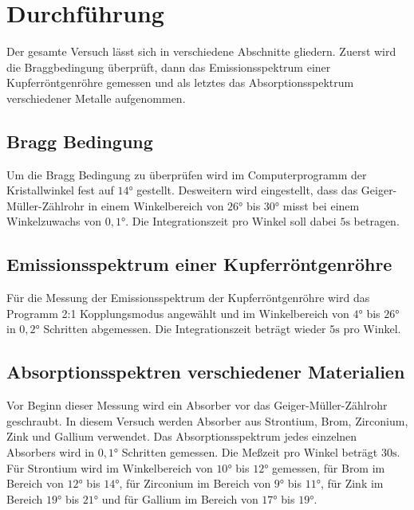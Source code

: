 \section{Durchführung}
\label{sec:Durchführung}
Der gesamte Versuch lässt sich in verschiedene Abschnitte gliedern. Zuerst wird die Braggbedingung überprüft, dann das Emissionsspektrum einer Kupferröntgenröhre 
gemessen und als letztes das Absorptionsspektrum verschiedener Metalle aufgenommen. 
\subsection{Bragg Bedingung}
Um die Bragg Bedingung zu überprüfen wird im Computerprogramm der Kristallwinkel fest auf $14 \unit{\degree}$ gestellt. Desweitern wird eingestellt, 
dass das Geiger-Müller-Zählrohr in einem Winkelbereich von $26 \unit{\degree}$ bis $30 \unit{\degree}$ misst bei einem Winkelzuwachs von $0,1 \unit{\degree}$. Die 
Integrationszeit pro Winkel soll dabei $5 \unit{\second}$ betragen. 

\subsection{Emissionsspektrum einer Kupferröntgenröhre}
Für die Messung der Emissionsspektrum der Kupferröntgenröhre wird das Programm 2:1 Kopplungsmodus angewählt und im Winkelbereich von $4 \unit{\degree}$ bis $26 \unit{\degree}$
in $0,2 \unit{\degree}$ Schritten abgemessen. Die Integrationszeit beträgt wieder $5 \unit{\second}$ pro Winkel. 

\subsection{Absorptionsspektren verschiedener Materialien}
Vor Beginn dieser Messung wird ein Absorber vor das Geiger-Müller-Zählrohr geschraubt. In diesem Versuch werden Absorber aus Strontium, Brom, Zirconium, Zink und Gallium
verwendet. Das Absorptionsspektrum jedes einzelnen Absorbers wird in $0,1 \unit{\degree}$ Schritten gemessen. Die Meßzeit pro Winkel beträgt $30 \unit{\second}$. 
Für Strontium wird im Winkelbereich von $10 \unit{\degree}$ bis $12 \unit{\degree}$ gemessen, für Brom im Bereich von $12 \unit{\degree}$ bis $14 \unit{\degree}$, 
für Zirconium im Bereich von $9 \unit{\degree}$ bis $11 \unit{\degree}$, für Zink im Bereich $19 \unit{\degree}$ bis $21 \unit{\degree}$ und für Gallium im 
Bereich von $17 \unit{\degree}$ bis $19 \unit{\degree}$. 

